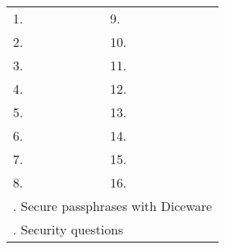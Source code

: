 \newpage

\changepage{}{.3in}{-.15in}{-.15in}{}{}{}{}{}

\newcommand{\myrule}{
	\hdashrule{1.35in}{0.5pt}{1.25pt}
}
\newcommand{\myrulespace}{
	\vspace{.24in}
}

\Large
\begin{center}
		
\textbf{}
\vspace{.275in}

\setlength{\tabcolsep}{1pt}
\begin{tabular}{l l l l }
	1. & \myrule &  9. & \myrule \myrulespace \\
	2. & \myrule & 10. & \myrule \myrulespace \\
	3. & \myrule & 11. & \myrule \myrulespace \\
	4. & \myrule & 12. & \myrule \myrulespace \\
	5. & \myrule & 13. & \myrule \myrulespace \\
	6. & \myrule & 14. & \myrule \myrulespace \\
	7. & \myrule & 15. & \myrule \myrulespace \\
	8. & \myrule & 16. & \myrule \vspace{.15in} \\
	\multicolumn{4}{l}{\pageref{ch:diceware}. Secure passphrases with Diceware} \vspace{.15in} \\
	\multicolumn{4}{l}{\pageref{ch:qna}. Security questions} \\
\end{tabular}

\end{center}

\newpage
\small
\changepage{}{-.3in}{.15in}{.15in}{}{}{}{}{}
